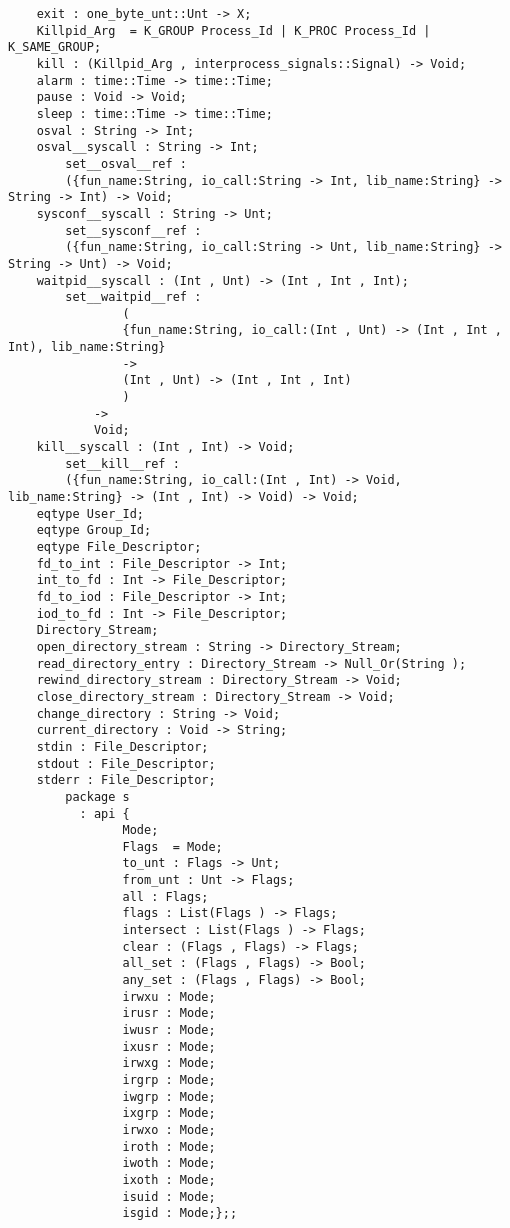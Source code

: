 \begin{verbatim}
    exit : one_byte_unt::Unt -> X;
    Killpid_Arg  = K_GROUP Process_Id | K_PROC Process_Id | K_SAME_GROUP;
    kill : (Killpid_Arg , interprocess_signals::Signal) -> Void;
    alarm : time::Time -> time::Time;
    pause : Void -> Void;
    sleep : time::Time -> time::Time;
    osval : String -> Int;
    osval__syscall : String -> Int;
        set__osval__ref :
        ({fun_name:String, io_call:String -> Int, lib_name:String} -> String -> Int) -> Void;
    sysconf__syscall : String -> Unt;
        set__sysconf__ref :
        ({fun_name:String, io_call:String -> Unt, lib_name:String} -> String -> Unt) -> Void;
    waitpid__syscall : (Int , Unt) -> (Int , Int , Int);
        set__waitpid__ref :
                (
                {fun_name:String, io_call:(Int , Unt) -> (Int , Int , Int), lib_name:String}
                ->
                (Int , Unt) -> (Int , Int , Int)
                )
            ->
            Void;
    kill__syscall : (Int , Int) -> Void;
        set__kill__ref :
        ({fun_name:String, io_call:(Int , Int) -> Void, lib_name:String} -> (Int , Int) -> Void) -> Void;
    eqtype User_Id;
    eqtype Group_Id;
    eqtype File_Descriptor;
    fd_to_int : File_Descriptor -> Int;
    int_to_fd : Int -> File_Descriptor;
    fd_to_iod : File_Descriptor -> Int;
    iod_to_fd : Int -> File_Descriptor;
    Directory_Stream;
    open_directory_stream : String -> Directory_Stream;
    read_directory_entry : Directory_Stream -> Null_Or(String );
    rewind_directory_stream : Directory_Stream -> Void;
    close_directory_stream : Directory_Stream -> Void;
    change_directory : String -> Void;
    current_directory : Void -> String;
    stdin : File_Descriptor;
    stdout : File_Descriptor;
    stderr : File_Descriptor;
        package s
          : api {
                Mode;
                Flags  = Mode;
                to_unt : Flags -> Unt;
                from_unt : Unt -> Flags;
                all : Flags;
                flags : List(Flags ) -> Flags;
                intersect : List(Flags ) -> Flags;
                clear : (Flags , Flags) -> Flags;
                all_set : (Flags , Flags) -> Bool;
                any_set : (Flags , Flags) -> Bool;
                irwxu : Mode;
                irusr : Mode;
                iwusr : Mode;
                ixusr : Mode;
                irwxg : Mode;
                irgrp : Mode;
                iwgrp : Mode;
                ixgrp : Mode;
                irwxo : Mode;
                iroth : Mode;
                iwoth : Mode;
                ixoth : Mode;
                isuid : Mode;
                isgid : Mode;};;

\end{verbatim}
